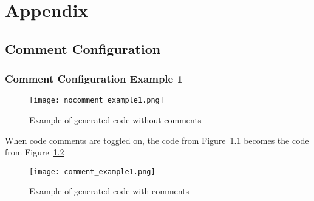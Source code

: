 
%

\chapter{Appendix}
\label{app:intro}



\section{Comment Configuration}
\label{app:comment}


\subsection{Comment Configuration Example 1}

\begin{figure}[htbp]
	\centering
	\texttt{[image: nocomment\_example1.png]}
	\caption{Example of generated code without comments}
	\label{figapp:nocomment_example1}
\end{figure}

When code comments are toggled on, the code from Figure~\ref{figapp:nocomment_example1} becomes the code from Figure~\ref{figapp:comment_example1}

\begin{figure}[htbp]
	\centering
	\texttt{[image: comment\_example1.png]}
	\caption{Example of generated code with comments}
	\label{figapp:comment_example1}
\end{figure}












